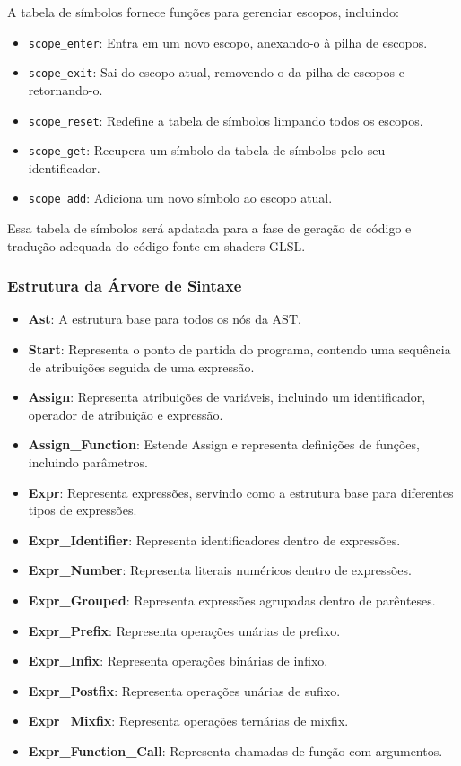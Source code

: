 \documentclass[english, 
               brazil, 
               bsc] %
               {dcomp-abntex2}
\begin{document}
A tabela de símbolos fornece funções para gerenciar escopos, incluindo:
\begin{itemize}
    \item \texttt{scope\_enter}: Entra em um novo escopo, anexando-o à pilha de escopos.
    \item \texttt{scope\_exit}: Sai do escopo atual, removendo-o da pilha de escopos e retornando-o.
    \item \texttt{scope\_reset}: Redefine a tabela de símbolos limpando todos os escopos.
    \item \texttt{scope\_get}: Recupera um símbolo da tabela de símbolos pelo seu identificador.
    \item \texttt{scope\_add}: Adiciona um novo símbolo ao escopo atual.
\end{itemize}


Essa tabela de símbolos será apdatada para a fase de geração de código e tradução adequada do código-fonte em shaders GLSL.


\subsubsection{Estrutura da Árvore de Sintaxe}

\begin{itemize}
\item \textbf{Ast}: A estrutura base para todos os nós da AST.
\item \textbf{Start}: Representa o ponto de partida do programa, contendo uma sequência de atribuições seguida de uma expressão.
\item \textbf{Assign}: Representa atribuições de variáveis, incluindo um identificador, operador de atribuição e expressão.
\item \textbf{Assign\_Function}: Estende Assign e representa definições de funções, incluindo parâmetros.
\item \textbf{Expr}: Representa expressões, servindo como a estrutura base para diferentes tipos de expressões.
\item \textbf{Expr\_Identifier}: Representa identificadores dentro de expressões.
\item \textbf{Expr\_Number}: Representa literais numéricos dentro de expressões.
\item \textbf{Expr\_Grouped}: Representa expressões agrupadas dentro de parênteses.
\item \textbf{Expr\_Prefix}: Representa operações unárias de prefixo.
\item \textbf{Expr\_Infix}: Representa operações binárias de infixo.
\item \textbf{Expr\_Postfix}: Representa operações unárias de sufixo.
\item \textbf{Expr\_Mixfix}: Representa operações ternárias de mixfix.
\item \textbf{Expr\_Function\_Call}: Representa chamadas de função com argumentos.

\end{itemize}
\end{document}
